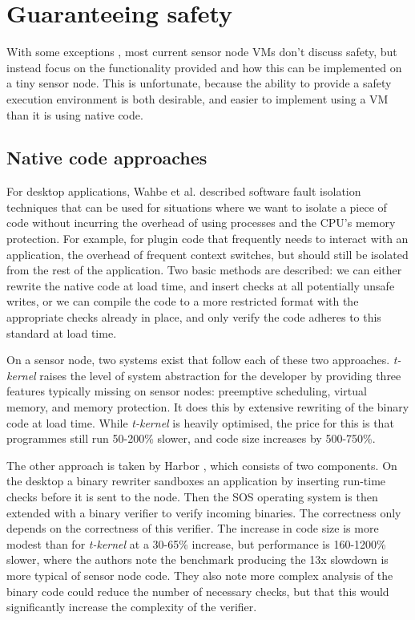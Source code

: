 \chapter{Guaranteeing safety}

With some exceptions \cite{Evers:2010ur}, most current sensor node VMs don't discuss safety, but instead focus on the functionality provided and how this can be implemented on a tiny sensor node. This is unfortunate, because the ability to provide a safety execution environment is both desirable, and easier to implement using a VM than it is using native code.

\section{Native code approaches}
For desktop applications, Wahbe et al. described software fault isolation \cite{Wahbe:1994cj} techniques that can be used for situations where we want to isolate a piece of code without incurring the overhead of using processes and the CPU's memory protection. For example, for plugin code that frequently needs to interact with an application, the overhead of frequent context switches, but should still be isolated from the rest of the application. Two basic methods are described: we can either rewrite the native code at load time, and insert checks at all potentially unsafe writes, or we can compile the code to a more restricted format with the appropriate checks already in place, and only verify the code adheres to this standard at load time.

On a sensor node, two systems exist that follow each of these two approaches. \emph{t-kernel} \cite{Gu:2006ww} raises the level of system abstraction for the developer by providing three features typically missing on sensor nodes: preemptive scheduling, virtual memory, and memory protection. It does this by extensive rewriting of the binary code at load time. While \emph{t-kernel} is heavily optimised, the price for this is that programmes still run 50-200\% slower, and code size increases by 500-750\%.

The other approach is taken by Harbor \cite{Kumar:2007ge}, which consists of two components. On the desktop a binary rewriter sandboxes an application by inserting run-time checks before it is sent to the node. Then the SOS operating system is then extended with a binary verifier to verify incoming binaries. The correctness only depends on the correctness of this verifier. The increase in code size is more modest than for \emph{t-kernel} at a 30-65\% increase, but performance is 160-1200\% slower, where the authors note the benchmark producing the 13x slowdown is more typical of sensor node code. They also note more complex analysis of the binary code could reduce the number of necessary checks, but that this would significantly increase the complexity of the verifier.

